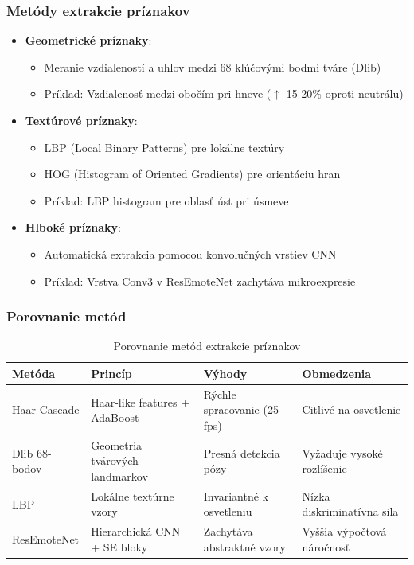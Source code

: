 \subsubsection{Metódy extrakcie príznakov}
\begin{itemize}
    \item \textbf{Geometrické príznaky}: 
    \begin{itemize}
        \item Meranie vzdialeností a uhlov medzi 68 kľúčovými bodmi tváre (Dlib)
        \item Príklad: Vzdialenosť medzi obočím pri hneve ($\uparrow$ 15-20\% oproti neutrálu)
    \end{itemize}
    
    \item \textbf{Textúrové príznaky}:
    \begin{itemize}
        \item LBP (Local Binary Patterns) pre lokálne textúry
        \item HOG (Histogram of Oriented Gradients) pre orientáciu hran
        \item Príklad: LBP histogram pre oblasť úst pri úsmeve
    \end{itemize}
    
    \item \textbf{Hlboké príznaky}:
    \begin{itemize}
        \item Automatická extrakcia pomocou konvolučných vrstiev CNN
        \item Príklad: Vrstva Conv3 v ResEmoteNet zachytáva mikroexpresie
    \end{itemize}
\end{itemize}

\subsubsection{Porovnanie metód}
\begin{table}[H]
\centering
\begin{tabularx}{\textwidth}{|l|X|X|X|}
    \hline
    \textbf{Metóda} & \textbf{Princíp} & \textbf{Výhody} & \textbf{Obmedzenia} \\ \hline
    Haar Cascade & Haar-like features + AdaBoost & Rýchle spracovanie (25 fps) & Citlivé na osvetlenie \\ \hline
    Dlib 68-bodov & Geometria tvárových landmarkov & Presná detekcia pózy & Vyžaduje vysoké rozlíšenie \\ \hline
    LBP & Lokálne textúrne vzory & Invariantné k osvetleniu & Nízka diskriminatívna sila \\ \hline
    ResEmoteNet & Hierarchická CNN + SE bloky & Zachytáva abstraktné vzory & Vyššia výpočtová náročnosť \\ \hline
\end{tabularx}
\caption{Porovnanie metód extrakcie príznakov}
\end{table}

